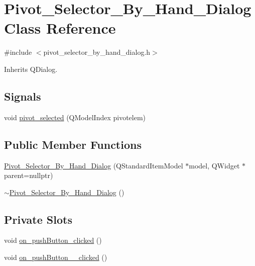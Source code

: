 \hypertarget{classPivot__Selector__By__Hand__Dialog}{}\section{Pivot\+\_\+\+Selector\+\_\+\+By\+\_\+\+Hand\+\_\+\+Dialog Class Reference}
\label{classPivot__Selector__By__Hand__Dialog}


{\ttfamily \#include $<$pivot\+\_\+selector\+\_\+by\+\_\+hand\+\_\+dialog.\+h$>$}



Inherits Q\+Dialog.

\subsection*{Signals}
\begin{DoxyCompactItemize}
\item 
void \hyperlink{classPivot__Selector__By__Hand__Dialog_add82981678d1a1a9e13f40437b69b454}{pivot\+\_\+selected} (Q\+Model\+Index pivotelem)
\end{DoxyCompactItemize}
\subsection*{Public Member Functions}
\begin{DoxyCompactItemize}
\item 
\hyperlink{classPivot__Selector__By__Hand__Dialog_a3bcba85b301015f7c386bf88fc5ae133}{Pivot\+\_\+\+Selector\+\_\+\+By\+\_\+\+Hand\+\_\+\+Dialog} (Q\+Standard\+Item\+Model $\ast$model, Q\+Widget $\ast$parent=nullptr)
\item 
\hyperlink{classPivot__Selector__By__Hand__Dialog_abbdf05b067ae3cad3485a28665e15f34}{$\sim$\+Pivot\+\_\+\+Selector\+\_\+\+By\+\_\+\+Hand\+\_\+\+Dialog} ()
\end{DoxyCompactItemize}
\subsection*{Private Slots}
\begin{DoxyCompactItemize}
\item 
void \hyperlink{classPivot__Selector__By__Hand__Dialog_a7b6670cc2ae59b079d844d032dc98b10}{on\+\_\+push\+Button\+\_\+clicked} ()
\item 
void \hyperlink{classPivot__Selector__By__Hand__Dialog_a1b1418059c849db9ca8522a550ba70d4}{on\+\_\+push\+Button\+\_\+\_\+clicked} ()
\end{DoxyCompactItemize}
